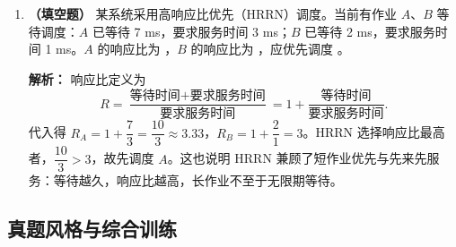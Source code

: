 \begin{enumerate}
\ifshowsolutions\par\noindent\textbf{解析：} 当每类资源只有一个实例时，资源分配图存在环是死锁的充要条件。当某类资源有多个实例时，环只是死锁的必要条件：环上的进程可能等待的资源实例由环外某个能继续推进的进程持有，等该进程释放后环就被打破。因此有环只能说明“可能死锁”，还必须通过资源分配图化简（或安全性检查）才能判定。\else \answerarea \fi

\vspace{8pt}

\item \textbf{（填空题）} 某系统采用高响应比优先（HRRN）调度。当前有作业 $A$、$B$ 等待调度：$A$ 已等待 7 ms，要求服务时间 3 ms；$B$ 已等待 2 ms，要求服务时间 1 ms。$A$ 的响应比为 \underline{\qquad}，$B$ 的响应比为 \underline{\qquad}，应优先调度 \underline{\qquad}。

\ifshowsolutions\par\noindent\textbf{解析：} 响应比定义为
\[
R=\frac{\text{等待时间}+\text{要求服务时间}}{\text{要求服务时间}}
=1+\frac{\text{等待时间}}{\text{要求服务时间}}.
\]
代入得 $R_A=1+\dfrac{7}{3}=\dfrac{10}{3}\approx 3.33$，$R_B=1+\dfrac{2}{1}=3$。HRRN 选择响应比最高者，$\dfrac{10}{3}>3$，故先调度 $A$。这也说明 HRRN 兼顾了短作业优先与先来先服务：等待越久，响应比越高，长作业不至于无限期等待。\else \answerarea \fi

\end{enumerate}

\subsection{真题风格与综合训练}

